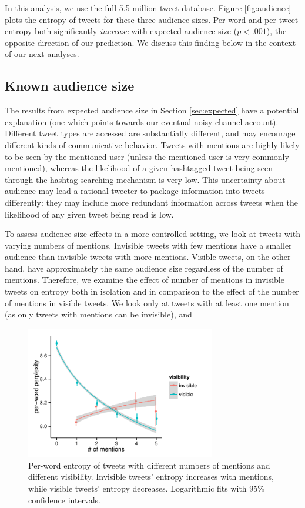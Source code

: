 \documentclass[11pt,letterpaper]{article}
\begin{document}
In this analysis, we use the full 5.5 million tweet database. Figure \ref{fig:audience} plots the entropy of tweets for these three audience sizes.  Per-word and per-tweet entropy both significantly {\it increase} with expected audience size ($p < .001$), the opposite direction of our prediction. We discuss this finding below in the context of our next analyses. 


\subsection{Known audience size}

The results from expected audience size in Section \ref{sec:expected} have a potential explanation (one which points towards our eventual noisy channel account). Different tweet types are accessed are substantially different, and may encourage different kinds of communicative behavior.  Tweets with mentions are highly likely to be seen by the mentioned user (unless the mentioned user is very commonly mentioned), whereas the likelihood of a given hashtagged tweet being seen through the hashtag-searching mechanism is very low.  This uncertainty about audience may lead a rational tweeter to package information into tweets differently: they may include more redundant information across tweets when the likelihood of any given tweet being read is low.

To assess audience size effects in a more controlled setting, we look at tweets with varying numbers of mentions.  Invisible tweets with few mentions have a smaller audience than invisible tweets with more mentions.  Visible tweets, on the other hand, have approximately the same audience size regardless of the number of mentions.  Therefore, we examine the effect of number of mentions in invisible tweets on entropy both in isolation and in comparison to the effect of the number of mentions in visible tweets.  We look only at tweets with at least one mention (as only tweets with mentions can be invisible), and 

\begin{figure}[t]
 \centering
  \includegraphics[width=3.25in]{figures/cmcl-mentions-pw2.pdf}
 \caption{Per-word entropy of tweets with different numbers of mentions and different visibility.  Invisible tweets' entropy increases with mentions, while visible tweets' entropy decreases.  Logarithmic fits with 95\% confidence intervals.}\label{fig:mentions}\vspace*{-.5em}
\end{figure}
\end{document}
